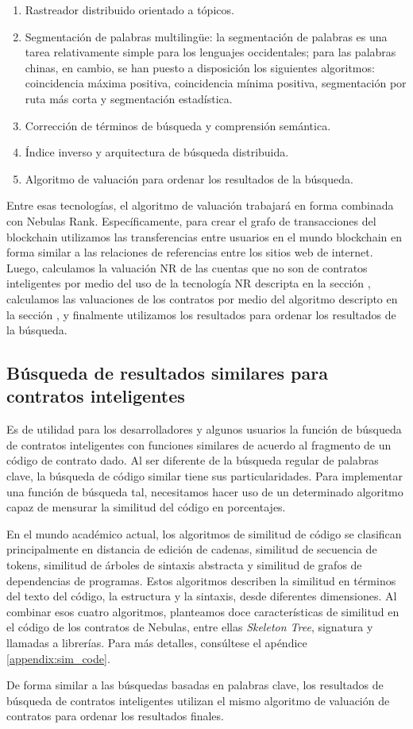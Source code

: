 \begin{enumerate}
	\item Rastreador distribuido orientado a tópicos.
	\item Segmentación de palabras multilingüe: la segmentación de palabras es una tarea relativamente simple para los lenguajes occidentales; para las palabras chinas, en cambio, se han puesto a disposición los siguientes algoritmos: coincidencia máxima positiva, coincidencia mínima positiva, segmentación por ruta más corta y segmentación estadística.
	\item Corrección de términos de búsqueda y comprensión semántica.
	\item Índice inverso y arquitectura de búsqueda distribuida.
	\item Algoritmo de valuación para ordenar los resultados de la búsqueda.

\end{enumerate}

Entre esas tecnologías, el algoritmo de valuación trabajará en forma combinada con Nebulas Rank. Específicamente, para crear el grafo de transacciones del blockchain utilizamos las transferencias entre usuarios en el mundo blockchain en forma similar a las relaciones de referencias entre los sitios web de internet. Luego, calculamos la valuación NR de las cuentas que no son de contratos inteligentes por medio del uso de la tecnología NR descripta en la sección , calculamos las valuaciones de los contratos por medio del algoritmo descripto en la sección , y finalmente utilizamos los resultados para ordenar los resultados de la búsqueda.

\subsection{Búsqueda de resultados similares para contratos inteligentes}

Es de utilidad para los desarrolladores y algunos usuarios la función de búsqueda de contratos inteligentes con funciones similares de acuerdo al fragmento de un código de contrato dado. Al ser diferente de la búsqueda regular de palabras clave, la búsqueda de código similar tiene sus particularidades. Para implementar una función de búsqueda tal, necesitamos hacer uso de un determinado algoritmo capaz de mensurar la similitud del código en porcentajes.

En el mundo académico actual, los algoritmos de similitud de código se clasifican principalmente en distancia de edición de cadenas, similitud de secuencia de tokens, similitud de árboles de sintaxis abstracta y similitud de grafos de dependencias de programas. Estos algoritmos describen la similitud en términos del texto del código, la estructura y la sintaxis, desde diferentes dimensiones. Al combinar esos cuatro algoritmos, planteamos doce características de similitud en el código de los contratos de Nebulas, entre ellas \textit{Skeleton Tree}, signatura y llamadas a librerías. Para más detalles, consúltese el apéndice \ref{appendix:sim_code}.

De forma similar a las búsquedas basadas en palabras clave, los resultados de búsqueda de contratos inteligentes utilizan el mismo algoritmo de valuación de contratos para ordenar los resultados finales.